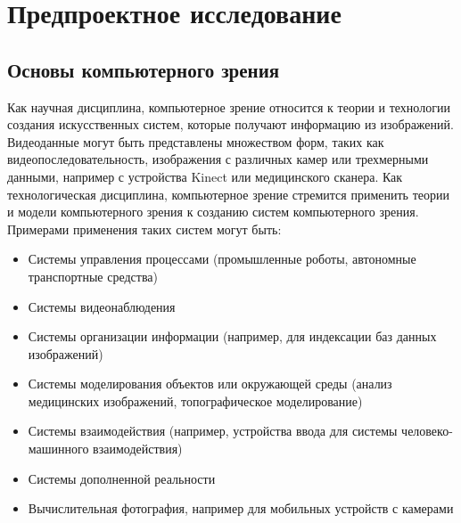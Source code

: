 \documentclass[12pt]{article}
\begin{document}
	\hspace{\parindent}

	\newpage
	\section{Предпроектное исследование}
		\subsection{Основы компьютерного зрения}

Как научная дисциплина, компьютерное зрение относится к теории и технологии создания искусственных систем, которые получают информацию из изображений. Видеоданные могут быть представлены множеством форм, таких как видеопоследовательность, изображения с различных камер или трехмерными данными, например с устройства Kinect или медицинского сканера.
Как технологическая дисциплина, компьютерное зрение стремится применить теории и модели компьютерного зрения к созданию систем компьютерного зрения. Примерами применения таких систем могут быть:
\begin{itemize}
\item Системы управления процессами (промышленные роботы, автономные транспортные средства)
\item Системы видеонаблюдения
\item Системы организации информации (например, для индексации баз данных изображений)
\item Системы моделирования объектов или окружающей среды (анализ медицинских изображений, топографическое моделирование)
\item Системы взаимодействия (например, устройства ввода для системы человеко-машинного взаимодействия)
\item Системы дополненной реальности
\item Вычислительная фотография, например для мобильных устройств с камерами
\end{itemize}
\end{document}

